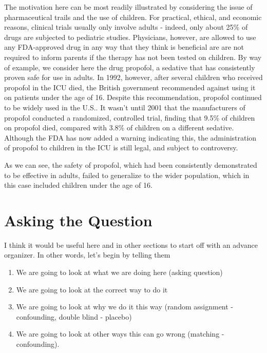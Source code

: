 \documentclass[
]{book}
\providecommand{\tightlist}{%
  \setlength{\itemsep}{0pt}\setlength{\parskip}{0pt}}
\theoremstyle{definition}
\theoremstyle{definition}
\theoremstyle{definition}
\theoremstyle{remark}
\begin{document}
The motivation here can be most readily illustrated by considering the issue of pharmaceutical trails and the use of children. For practical, ethical, and economic reasons, clinical trials usually only involve adults - indeed, only about 25\% of drugs are subjected to pediatric studies. Physicians, however, are allowed to use any FDA-approved drug in any way that they think is beneficial are are not required to inform parents if the therapy has not been tested on children.
By way of example, we consider here the drug propofol, a sedative that has consistently proven safe for use in adults. In 1992, however, after several children who received propofol in the ICU died, the British government recommended against using it on patients under the age of 16. Despite this recommendation, propofol continued to be widely used in the U.S.. It wasn't until 2001 that the manufacturers of propofol conducted a randomized, controlled trial, finding that 9.5\% of children on propofol died, compared with 3.8\% of children on a different sedative. Although the FDA has now added a warning indicating this, the administration of propofol to children in the ICU is still legal, and subject to controversy.

As we can see, the safety of propofol, which had been consistently demonstrated to be effective in adults, failed to generalize to the wider population, which in this case included children under the age of 16.

\hypertarget{asking-the-question}{%
\section{Asking the Question}\label{asking-the-question}}

I think it would be useful here and in other sections to start off with an advance organizer. In other words, let's begin by telling them

\begin{enumerate}
\def\labelenumi{\arabic{enumi}.}
\tightlist
\item
  We are going to look at what we are doing here (asking question)
\item
  We are going to look at the correct way to do it
\item
  We are going to look at why we do it this way (random assignment - confounding, double blind - placebo)
\item
  We are going to look at other ways this can go wrong (matching - confounding).
\end{enumerate}
\end{document}
